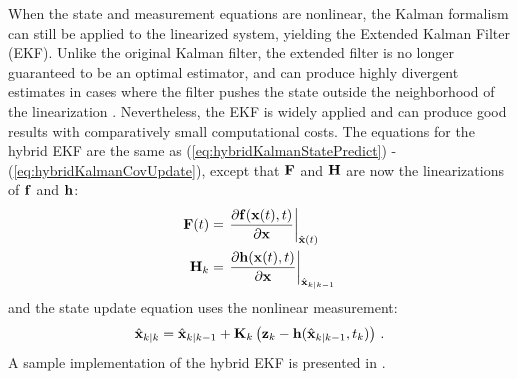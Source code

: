 When the state and measurement equations are nonlinear, the Kalman formalism can still be applied to the linearized system, yielding the Extended Kalman Filter (EKF).  Unlike the original Kalman filter, the extended filter is no longer guaranteed to be an optimal estimator, and can produce highly divergent estimates in cases where the filter pushes the state outside the neighborhood of the linearization \citep{crassidis2004}.  Nevertheless, the EKF is widely applied and can produce good results with comparatively small computational costs.  The equations for the hybrid EKF are the same as (\ref{eq:hybridKalmanStatePredict}) - (\ref{eq:hybridKalmanCovUpdate}), except that $\mathbf F$ and $\mathbf H$ are now the linearizations of $\mathbf f$ and $\mathbf h$:
\begin{align}
\mathbf F(t) &= \left.\frac{\partial \mathbf f(\mathbf x(t),t)}{\partial \mathbf x}\right|_{\hat{\mathbf x}(t)} \\
\mathbf H_k &= \left.\frac{\partial \mathbf h(\mathbf x(t),t)}{\partial \mathbf x} \right|_{\hat{\mathbf x}_{k|k-1}}
\end{align}
and the state update equation uses the nonlinear measurement:
\begin{equation}\label{eq:hybridEKFStateUpdate}
\hat{\mathbf x}_{k|k} = \hat{\mathbf x}_{k|k-1} + \mathbf K_k \left( \mathbf z_k - \mathbf h(\hat{\mathbf x}_{k|k-1},t_k)\right) \,.
\end{equation}
A sample implementation of the hybrid EKF is presented in .  

